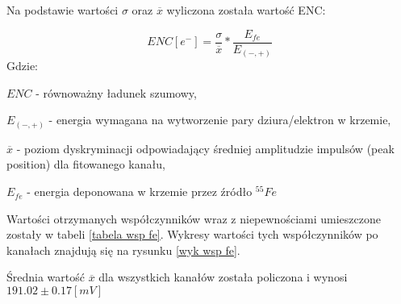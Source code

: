 Na podstawie wartości $\sigma$ oraz $\overline{x}$ wyliczona została wartość ENC:

\begin{equation}
        ENC [e^-] = \frac{\sigma}{\overline{x}} * \frac{E_{fe}}{E_{(-,+)}}
\end{equation}
Gdzie:
\begin{description}
        \item $ENC$  - równoważny ładunek szumowy,
        \item $E_{(-,+)}$ - energia wymagana na wytworzenie pary dziura/elektron w krzemie,
        \item $\overline{x}$ - poziom dyskryminacji odpowiadający średniej amplitudzie impulsów (peak position) dla fitowanego kanału,
        \item $E_{fe}$ -  energia deponowana w krzemie przez źródło ${}^{55}Fe$
\end{description}

Wartości otrzymanych współczynników wraz z niepewnościami umieszczone zostały w tabeli \ref{tabela wsp fe}. Wykresy wartości tych współczynników po kanałach znajdują się na rysunku \ref{wyk wsp fe}.

Średnia wartość $\overline{x}$ dla wszystkich kanałów została policzona i wynosi $191.02 \pm 0.17 [mV]$



